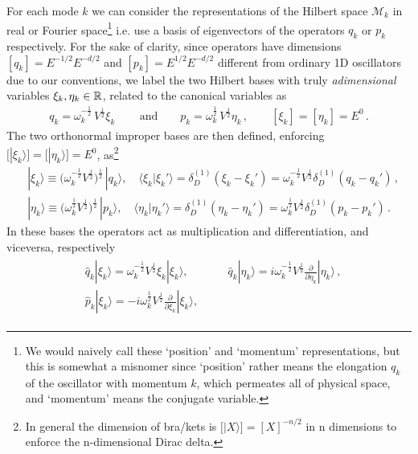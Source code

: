 \documentclass[../QFT_main.tex]{subfiles}
\begin{document}
\begin{mytheorem}
For each mode $k$ we can consider the representations of the Hilbert space $\mathcal{M}_k$ in real or Fourier space\footnote{We would naively call these `position' and `momentum' representations, but this is somewhat a misnomer since `position' rather means the elongation $q_k$ of the oscillator with momentum $k$, which permeates all of physical space, and `momentum' means the conjugate variable.} i.e. use a basis of eigenvectors of the operators $q_k$ or $p_k$ respectively.
%
For the sake of clarity, since operators have dimensions $[q_k]=E^{-1/2} E^{-d/2}$ and $[p_k]=E^{1/2} E^{-d/2}$ different from ordinary 1D oscillators due to our conventions, we label the two Hilbert bases with truly \emph{adimensional} variables $\xi_k, \eta_k\in\mathbb{R}$, related to the canonical variables as
\begin{align}
    q_k=\omega_k^{-\frac{1}{2}}\, V^{\frac{1}{2}}\xi_k\,
    \qquad\text{and}\qquad
    p_k = \omega_k^{\frac{1}{2}}\, V^{\frac{1}{2}} \eta_k\,,
    \qquad [\xi_k]=[\eta_k]=E^0\,.
\end{align}
%
The two orthonormal improper bases are then defined, enforcing $\big[|\xi_k\rangle\big]=\big[|\eta_k\rangle\big]= E^{0}$, as\footnote{\label{fn:energy_dimension_bra_kets}In general the dimension of bra/kets is $\big[|X\rangle\big]=[X]^{-n/2}$ in n dimensions to enforce the n-dimensional Dirac delta.}
\begin{align}
    &|\xi_k\rangle \equiv \Big(\omega_k^{-\frac{1}{2}}  V^{\frac{1}{2}}\Big)^{\frac{1}{2}}\,|q_k\rangle, \quad \langle \xi_k | \xi_k' \rangle = \delta^{(1)}_D(\xi_k - \xi_k') = \omega_k^{-\frac{1}{2}} V^{\frac{1}{2}}\delta^{(1)}_D(q_k - q_k')\,,
    \\
    &|\eta_k\rangle \equiv \Big(\omega_k^{\frac{1}{2}} V^{\frac{1}{2}}\Big)^{\frac{1}{2}}\, |p_k\rangle,\quad 
    \langle \eta_k | \eta_k' \rangle = \delta^{(1)}_D(\eta_k - \eta_k') = \omega_k^{\frac{1}{2}} V^{\frac{1}{2}}\delta^{(1)}_D(p_k - p_k')\,.
\end{align}
In these bases the operators act as multiplication and differentiation, and viceversa, respectively
\begin{align}
\begin{aligned}
    &\hat{q}_k | \xi_k \rangle = \omega_k^{-\frac{1}{2}} V^{\frac{1}{2}} \xi_k | \xi_k \rangle, 
    \qquad\quad\,\,\, \hat{q}_k | \eta_k \rangle = i \omega_k^{-\frac{1}{2}} V^{\frac{1}{2}} \frac{\partial}{\partial \eta_k} | \eta_k \rangle\,,
    \\[4pt]
    &\hat{p}_k | \xi_k \rangle = -i \omega_k^{\frac{1}{2}} V^{\frac{1}{2}} \frac{\partial}{\partial \xi_k} | \xi_k \rangle,

\end{aligned}
\end{align}
\end{mytheorem}
\end{document}
